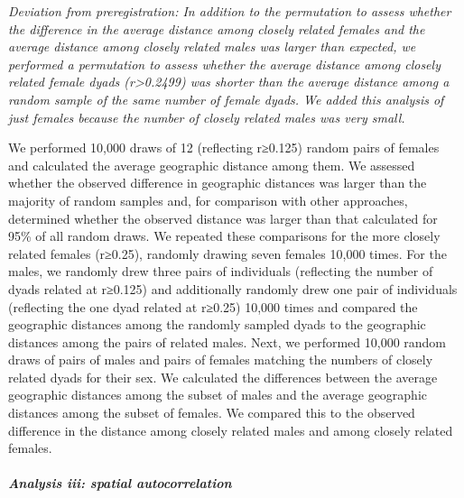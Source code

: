 \documentclass[
]{article}
\begin{document}
\emph{Deviation from preregistration: In addition to the permutation to
assess whether the difference in the average distance among closely
related females and the average distance among closely related males was
larger than expected, we performed a permutation to assess whether the
average distance among closely related female dyads
(r\textgreater0.2499) was shorter than the average distance among a
random sample of the same number of female dyads. We added this analysis
of just females because the number of closely related males was very
small.}

We performed 10,000 draws of 12 (reflecting r≥0.125) random pairs of
females and calculated the average geographic distance among them. We
assessed whether the observed difference in geographic distances was
larger than the majority of random samples and, for comparison with
other approaches, determined whether the observed distance was larger
than that calculated for 95\% of all random draws. We repeated these
comparisons for the more closely related females (r≥0.25), randomly
drawing seven females 10,000 times. For the males, we randomly drew
three pairs of individuals (reflecting the number of dyads related at
r≥0.125) and additionally randomly drew one pair of individuals
(reflecting the one dyad related at r≥0.25) 10,000 times and compared
the geographic distances among the randomly sampled dyads to the
geographic distances among the pairs of related males. Next, we
performed 10,000 random draws of pairs of males and pairs of females
matching the numbers of closely related dyads for their sex. We
calculated the differences between the average geographic distances
among the subset of males and the average geographic distances among the
subset of females. We compared this to the observed difference in the
distance among closely related males and among closely related females.

\hypertarget{analysis-iii-spatial-autocorrelation}{%
\paragraph{\texorpdfstring{\emph{Analysis iii: spatial
autocorrelation}}{Analysis iii: spatial autocorrelation}}\label{analysis-iii-spatial-autocorrelation}}
\end{document}
